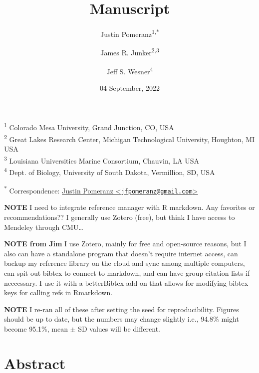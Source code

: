 \documentclass[
]{article}
\title{Manuscript}
\author{Justin Pomeranz\textsuperscript{1,*} \and James R.
Junker\textsuperscript{2,3} \and Jeff S. Wesner\textsuperscript{4}}
\date{04 September, 2022}
\begin{document}
\maketitle

{
\setcounter{tocdepth}{2}
\tableofcontents
}
\textsuperscript{1} Colorado Mesa University, Grand Junction, CO, USA\\
\textsuperscript{2} Great Lakes Research Center, Michigan Technological
University, Houghton, MI USA\\
\textsuperscript{3} Louisiana Universities Marine Consortium, Chauvin,
LA USA\\
\textsuperscript{4} Dept. of Biology, University of South Dakota,
Vermillion, SD, USA

\textsuperscript{*} Correspondence:
\href{mailto:jfpomeranz@gmail.com}{Justin Pomeranz
\textless{}\href{mailto:jfpomeranz@gmail.com}{\nolinkurl{jfpomeranz@gmail.com}}\textgreater{}}

\textbf{NOTE} I need to integrate reference manager with R markdown. Any
favorites or recommendations?? I generally use Zotero (free), but think
I have access to Mendeley through CMU\ldots{}

\textbf{NOTE from Jim} I use Zotero, mainly for free and open-source
reasons, but I also can have a standalone program that doesn't require
internet access, can backup my reference library on the cloud and sync
among multiple computers, can spit out bibtex to connect to markdown,
and can have group citation lists if neccessary. I use it with a
betterBibtex add on that allows for modifying bibtex keys for calling
refs in Rmarkdown.

\textbf{NOTE} I re-ran all of these after setting the seed for
reproducibility. Figures should be up to date, but the numbers may
change slightly i.e., 94.8\% might become 95.1\%, mean \(\pm\) SD values
will be different.

\hypertarget{abstract}{%
\section{Abstract}\label{abstract}}
\end{document}
